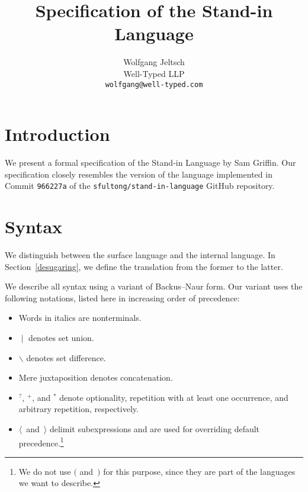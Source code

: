 \documentclass{scrartcl}
\title{Specification of the Stand-in Language}
\author{%
    Wolfgang Jeltsch\\
    \small Well-Typed LLP\\
    \small\texttt{wolfgang@well-typed.com}%
}
\newcommand{\optional}{^?}
\newcommand{\some}{^+}
\newcommand{\many}{^*}
\begin{document}
\maketitle

\section{Introduction}

We present a formal specification of the Stand-in Language by Sam
Griffin. Our specification closely resembles the version of the language
implemented in Commit \texttt{966227a} of the
\texttt{sfultong/stand-in-language} GitHub repository.

\section{Syntax}

We distinguish between the surface language and the internal language.
In Section~\ref{desugaring}, we define the translation from the former
to the latter.

We describe all syntax using a variant of Backus–Naur form. Our variant
uses the following notations, listed here in increasing order of
precedence:
\begin{itemize}

\item

Words in italics are nonterminals.

\item

$∣$ denotes set union.

\item

$∖$ denotes set difference.

\item

Mere juxtaposition denotes concatenation.

\item

$\optional$, $\some$, and $\many$ denote optionality, repetition with at
least one occurrence, and arbitrary repetition, respectively.

\item

$⟨$~and~$⟩$ delimit subexpressions and are used for overriding default
precedence.\footnote{We do not use $($ and~$)$ for this purpose, since
they are part of the languages we want to describe.}

\end{itemize}
\end{document}
